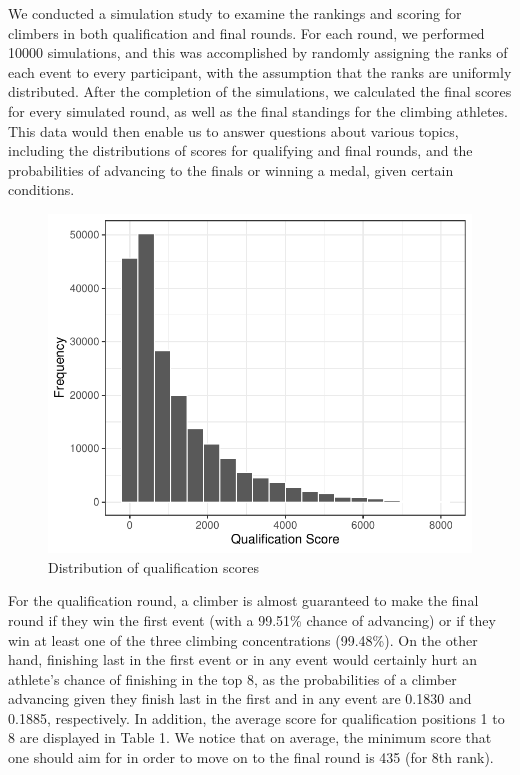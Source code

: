 \documentclass[12pt]{article}
\begin{document}
We conducted a simulation study to examine the rankings and scoring for
climbers in both qualification and final rounds. For each round, we
performed 10000 simulations, and this was accomplished by randomly
assigning the ranks of each event to every participant, with the
assumption that the ranks are uniformly distributed. After the
completion of the simulations, we calculated the final scores for every
simulated round, as well as the final standings for the climbing
athletes. This data would then enable us to answer questions about
various topics, including the distributions of scores for qualifying and
final rounds, and the probabilities of advancing to the finals or
winning a medal, given certain conditions.

\begin{figure}
\centering
\includegraphics{draft_files/figure-latex/unnamed-chunk-4-1.pdf}
\caption{Distribution of qualification scores}
\end{figure}

For the qualification round, a climber is almost guaranteed to make the
final round if they win the first event (with a 99.51\% chance of
advancing) or if they win at least one of the three climbing
concentrations (99.48\%). On the other hand, finishing last in the first
event or in any event would certainly hurt an athlete's chance of
finishing in the top 8, as the probabilities of a climber advancing
given they finish last in the first and in any event are 0.1830 and
0.1885, respectively. In addition, the average score for qualification
positions 1 to 8 are displayed in Table 1. We notice that on average,
the minimum score that one should aim for in order to move on to the
final round is 435 (for 8th rank).
\end{document}
